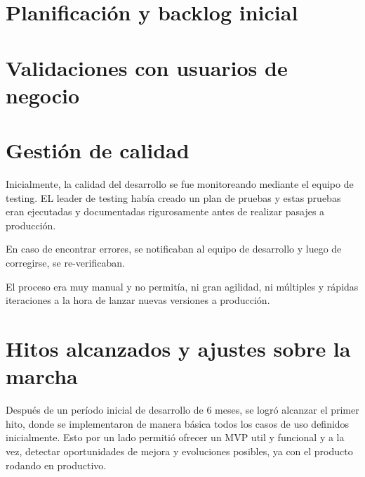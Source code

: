 

\section{Planificación y backlog inicial}

\section{Validaciones con usuarios de negocio}

\section{Gestión de calidad}

Inicialmente, la calidad del desarrollo se fue monitoreando mediante el equipo de testing. EL leader de testing había creado un plan de pruebas y estas pruebas eran ejecutadas y documentadas rigurosamente antes de realizar pasajes a producción. 

En caso de encontrar errores, se notificaban al equipo de desarrollo y luego de corregirse, se re-verificaban. 

El proceso era muy manual y no permitía, ni gran agilidad, ni múltiples y rápidas iteraciones a la hora de lanzar nuevas versiones a producción.

\section{Hitos alcanzados y ajustes sobre la marcha}
Después de un período inicial de desarrollo de 6 meses, se logró alcanzar el primer hito, donde se implementaron de manera básica todos los casos de uso definidos inicialmente. Esto por un lado permitió ofrecer un MVP util y funcional y a la vez, detectar oportunidades de mejora y evoluciones posibles, ya con el producto rodando en productivo.

